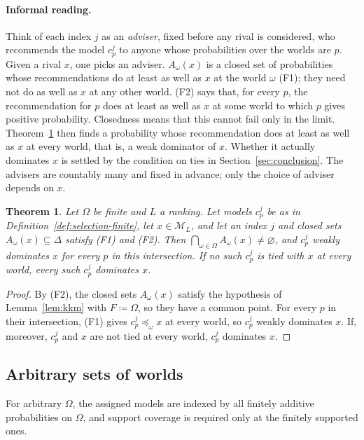 \documentclass[11pt]{article}
\newtheorem{theorem}{Theorem}[section]
\theoremstyle{definition}
\theoremstyle{remark}
\newcommand{\M}{\mathcal M}
\begin{document}
\paragraph{Informal reading.} Think of each index $j$ as an \emph{adviser}, fixed before any rival is considered, who recommends the model $c^j_p$ to anyone whose probabilities over the worlds are $p$. Given a rival $x$, one picks an adviser. $A_\omega(x)$ is a closed set of probabilities whose recommendations do at least as well as $x$ at the world $\omega$ (F1); they need not do as well as $x$ at any other world. (F2) says that, for every $p$, the recommendation for $p$ does at least as well as $x$ at some world to which $p$ gives positive probability. Closedness means that this cannot fail only in the limit. Theorem~\ref{thm:finite} then finds a probability whose recommendation does at least as well as $x$ at every world, that is, a weak dominator of $x$. Whether it actually dominates $x$ is settled by the condition on ties in Section~\ref{sec:conclusion}. The advisers are countably many and fixed in advance; only the choice of adviser depends on $x$.

\begin{theorem}\label{thm:finite}
Let $\Omega$ be finite and $L$ a ranking. Let models $c^j_p$ be as in Definition~\ref{def:selection-finite}, let $x\in\M_L$, and let an index $j$ and closed sets $A_\omega(x)\subseteq\Delta$ satisfy (F1) and (F2). Then $\bigcap_{\omega\in\Omega}A_\omega(x)\ne\varnothing$, and $c^j_p$ weakly dominates $x$ for every $p$ in this intersection. If no such $c^j_p$ is tied with $x$ at every world, every such $c^j_p$ dominates $x$.
\end{theorem}
\begin{proof}
By (F2), the closed sets $A_\omega(x)$ satisfy the hypothesis of Lemma~\ref{lem:kkm} with $F\coloneqq\Omega$, so they have a common point. For every $p$ in their intersection, (F1) gives $c^j_p\preceq_\omega x$ at every world, so $c^j_p$ weakly dominates $x$. If, moreover, $c^j_p$ and $x$ are not tied at every world, $c^j_p$ dominates $x$.
\end{proof}
\endgroup

\subsection{Arbitrary sets of worlds}

{\color{red}For arbitrary $\Omega$, the assigned models are indexed by all finitely additive probabilities on $\Omega$, and support coverage is required only at the finitely supported ones.}
\end{document}
